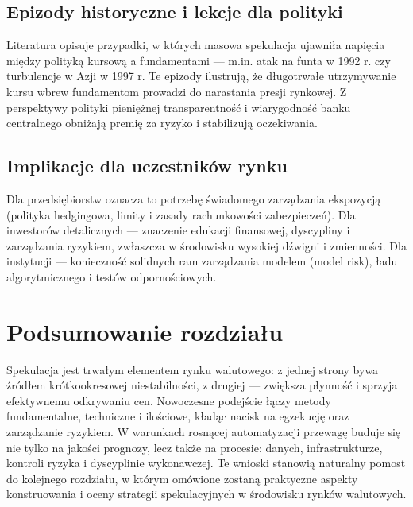 \subsection{Epizody historyczne i lekcje dla polityki}
Literatura opisuje przypadki, w których masowa spekulacja ujawniła napięcia między polityką kursową a fundamentami — m.in. atak na funta w 1992 r. czy turbulencje w Azji w 1997 r. Te epizody ilustrują, że długotrwałe utrzymywanie kursu wbrew fundamentom prowadzi do narastania presji rynkowej. Z perspektywy polityki pieniężnej transparentność i wiarygodność banku centralnego obniżają premię za ryzyko i stabilizują oczekiwania.

\subsection{Implikacje dla uczestników rynku}
Dla przedsiębiorstw oznacza to potrzebę świadomego zarządzania ekspozycją (polityka hedgingowa, limity i zasady rachunkowości zabezpieczeń). Dla inwestorów detalicznych — znaczenie edukacji finansowej, dyscypliny i zarządzania ryzykiem, zwłaszcza w środowisku wysokiej dźwigni i zmienności. Dla instytucji — konieczność solidnych ram zarządzania modelem (model risk), ładu algorytmicznego i testów odpornościowych.

\section{Podsumowanie rozdziału}

Spekulacja jest trwałym elementem rynku walutowego: z jednej strony bywa źródłem krótkookresowej niestabilności, z drugiej — zwiększa płynność i sprzyja efektywnemu odkrywaniu cen. Nowoczesne podejście łączy metody fundamentalne, techniczne i ilościowe, kładąc nacisk na egzekucję oraz zarządzanie ryzykiem. W warunkach rosnącej automatyzacji przewagę buduje się nie tylko na jakości prognozy, lecz także na procesie: danych, infrastrukturze, kontroli ryzyka i dyscyplinie wykonawczej. Te wnioski stanowią naturalny pomost do kolejnego rozdziału, w którym omówione zostaną praktyczne aspekty konstruowania i oceny strategii spekulacyjnych w środowisku rynków walutowych.
